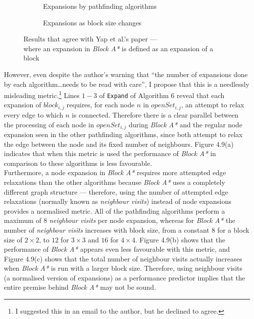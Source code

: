 \documentclass[12pt,notitlepage]{report}
\begin{document}
\begin{figure}
\centering
  \begin{subfigure}{0.49\textwidth}
  \centering
  
  \caption{Expansions by pathfinding algorithms}
  \end{subfigure}
  \begin{subfigure}{0.49\textwidth}
  \centering
  
  \caption{Expansions as block size changes}
  \end{subfigure}
\caption[Results that agree with Yap et al.'s paper]{Results that agree with Yap et al.'s paper --- \\where an expansion in {\em Block A*} is defined as an expansion of a block}
\end{figure}

\noindent
However, even despite the author's warning that ``the number of expansions done by each algorithm\ldots needs to be read with care'', I propose that this is a needlessly misleading metric.\footnote{I suggested this in an email to the author, but he declined to agree.} Lines $1-3$ of {\tt Expand} of Algorithm 6 reveal that each expansion of $block_{i,j}$ requires, for each node $n$ in $openSet_{i,j}$, an attempt to relax every edge to which $n$ is connected. Therefore there is a clear parallel between the processing of each node in $openSet_{i,j}$ during {\em Block A*} and the regular node expansion seen in the other pathfinding algorithms, since both attempt to relax the edge between the node and its fixed number of neighbours. Figure 4.9(a) indicates that when this metric is used the performance of {\em Block A*} in comparison to these algorithms is less favourable.\\

\noindent
Furthermore, a node expansion in {\em Block A*} requires more attempted edge relaxations than the other algorithms because {\em Block A*} uses a completely different graph structure --- therefore, using the number of attempted edge relaxations (normally known as {\em neighbour visits}) instead of node expansions provides a normalised metric. All of the pathfinding algorithms perform a maximum of $8$ {\em neighbour visits} per node expansion, whereas for {\em Block A*} the number of {\em neighbour visits} increases with block size, from a constant $8$ for a block size of $2 \times 2$, to $12$ for $3\times 3$ and $16$ for $4 \times 4$. Figure 4.9(b) shows that the performance of {\em Block A*} appears even less favourable with this metric, and Figure 4.9(c) shows that the total number of neighbour visits actually increases when {\em Block A*} is run with a larger block size. Therefore, using neighbour visits (a normalised version of expansions) as a performance predictor implies that the entire premise behind {\em Block A*} may not be sound.\\
\end{document}

